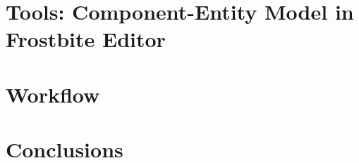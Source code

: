 \documentclass[10pt,letterpaper]{article}
\begin{document}
\section{Tools: Component-Entity Model in Frostbite Editor}

\section{Workflow}

\section{Conclusions}



\clearpage
{}



\end{document}
